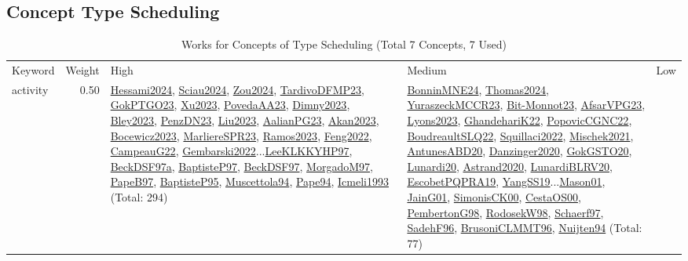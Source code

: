 \clearpage
\subsection{Concept Type Scheduling}
\label{sec:Scheduling}
\label{Scheduling}
{\scriptsize
\begin{longtable}{p{3cm}r>{\raggedright\arraybackslash}p{6cm}>{\raggedright\arraybackslash}p{6cm}>{\raggedright\arraybackslash}p{8cm}}
\rowcolor{white}\caption{Works for Concepts of Type Scheduling (Total 7 Concepts, 7 Used)}\\ \toprule
\rowcolor{white}Keyword & Weight & High & Medium & Low\\ \midrule\endhead
\bottomrule
\endfoot
\index{activity}\index{Scheduling!activity}activity &  0.50 & \hyperref[detail:Hessami2024]{Hessami2024}, \hyperref[detail:Sciau2024]{Sciau2024}, \hyperref[detail:Zou2024]{Zou2024}, \hyperref[detail:TardivoDFMP23]{TardivoDFMP23}, \hyperref[detail:GokPTGO23]{GokPTGO23}, \hyperref[detail:Xu2023]{Xu2023}, \hyperref[detail:PovedaAA23]{PovedaAA23}, \hyperref[detail:Dimny2023]{Dimny2023}, \hyperref[detail:Bley2023]{Bley2023}, \hyperref[detail:PenzDN23]{PenzDN23}, \hyperref[detail:Liu2023]{Liu2023}, \hyperref[detail:AalianPG23]{AalianPG23}, \hyperref[detail:Akan2023]{Akan2023}, \hyperref[detail:Bocewicz2023]{Bocewicz2023}, \hyperref[detail:MarliereSPR23]{MarliereSPR23}, \hyperref[detail:Ramos2023]{Ramos2023}, \hyperref[detail:Feng2022]{Feng2022}, \hyperref[detail:CampeauG22]{CampeauG22}, \hyperref[detail:Gembarski2022]{Gembarski2022}...\hyperref[detail:LeeKLKKYHP97]{LeeKLKKYHP97}, \hyperref[detail:BeckDSF97a]{BeckDSF97a}, \hyperref[detail:BaptisteP97]{BaptisteP97}, \hyperref[detail:BeckDSF97]{BeckDSF97}, \hyperref[detail:MorgadoM97]{MorgadoM97}, \hyperref[detail:PapeB97]{PapeB97}, \hyperref[detail:BaptisteP95]{BaptisteP95}, \hyperref[detail:Muscettola94]{Muscettola94}, \hyperref[detail:Pape94]{Pape94}, \hyperref[detail:Icmeli1993]{Icmeli1993} (Total: 294) & \hyperref[detail:BonninMNE24]{BonninMNE24}, \hyperref[detail:Thomas2024]{Thomas2024}, \hyperref[detail:YuraszeckMCCR23]{YuraszeckMCCR23}, \hyperref[detail:Bit-Monnot23]{Bit-Monnot23}, \hyperref[detail:AfsarVPG23]{AfsarVPG23}, \hyperref[detail:Lyons2023]{Lyons2023}, \hyperref[detail:GhandehariK22]{GhandehariK22}, \hyperref[detail:PopovicCGNC22]{PopovicCGNC22}, \hyperref[detail:BoudreaultSLQ22]{BoudreaultSLQ22}, \hyperref[detail:Squillaci2022]{Squillaci2022}, \hyperref[detail:Mischek2021]{Mischek2021}, \hyperref[detail:AntunesABD20]{AntunesABD20}, \hyperref[detail:Danzinger2020]{Danzinger2020}, \hyperref[detail:GokGSTO20]{GokGSTO20}, \hyperref[detail:Lunardi20]{Lunardi20}, \hyperref[detail:Astrand2020]{Astrand2020}, \hyperref[detail:LunardiBLRV20]{LunardiBLRV20}, \hyperref[detail:EscobetPQPRA19]{EscobetPQPRA19}, \hyperref[detail:YangSS19]{YangSS19}...\hyperref[detail:Mason01]{Mason01}, \hyperref[detail:JainG01]{JainG01}, \hyperref[detail:SimonisCK00]{SimonisCK00}, \hyperref[detail:CestaOS00]{CestaOS00}, \hyperref[detail:PembertonG98]{PembertonG98}, \hyperref[detail:RodosekW98]{RodosekW98}, \hyperref[detail:Schaerf97]{Schaerf97}, \hyperref[detail:SadehF96]{SadehF96}, \hyperref[detail:BrusoniCLMMT96]{BrusoniCLMMT96}, \hyperref[detail:Nuijten94]{Nuijten94} (Total: 77) & 
\end{longtable}}
